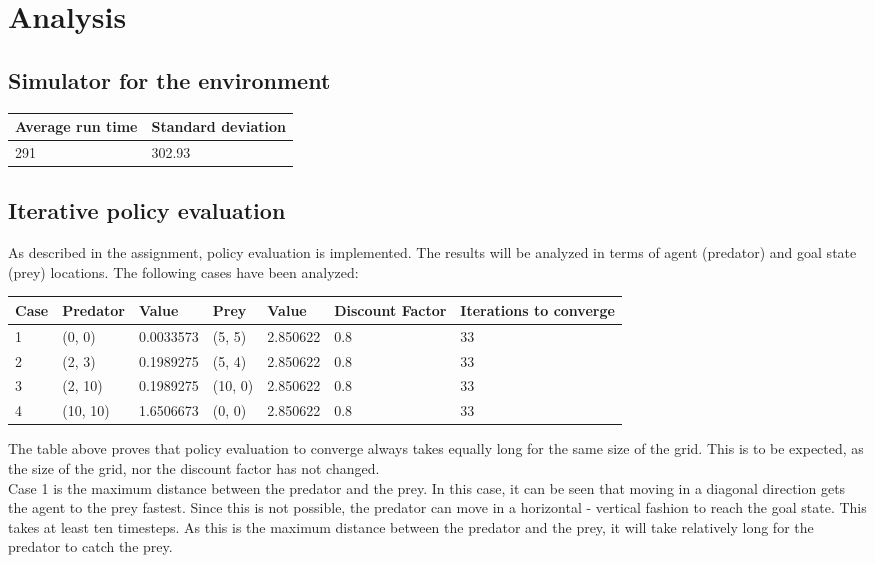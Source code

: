 \documentclass{article}
\begin{document}
\section*{Analysis}


\subsection*{Simulator for the environment}


\begin{center}
	\begin{tabular}{  l ||  l }
		Average run time & Standard deviation \\ 
		\hline
		291 &  302.93 %
	\end{tabular}
\end{center}

\subsection*{Iterative policy evaluation}
As described in the assignment, policy evaluation is implemented. The results will be analyzed in terms of agent (predator) and goal state (prey) locations. The following cases have been analyzed: 
\begin{center}
	\begin{tabular}{ |l | l | l | l | l | l | l| }
		Case & Predator & Value & Prey & Value & Discount Factor & Iterations to converge \\ 
		\hline
		1 & (0, 0) & 0.0033573 & (5, 5) & 2.850622 & 0.8 & 33 \\
		2 & (2, 3) & 0.1989275 & (5, 4) & 2.850622 & 0.8 & 33 \\
		3 & (2, 10) & 0.1989275 & (10, 0) & 2.850622 & 0.8 & 33 \\
		4 & (10, 10) & 1.6506673 & (0, 0) & 2.850622 & 0.8 & 33 \\	
	\end{tabular}
\end{center}

The table above proves that policy evaluation to converge always takes equally long for the same size of the grid. This is to be expected, as the size of the grid, nor the discount factor has not changed.\\

Case 1 is the maximum distance between the predator and the prey. In this case, it can be seen that moving in a diagonal direction gets the agent to the prey fastest. Since this is not possible, the predator can move in a horizontal - vertical fashion to reach the goal state. This takes at least ten timesteps. As this is the maximum distance between the predator and the prey, it will take relatively long for the predator to catch the prey. \\
\end{document}
